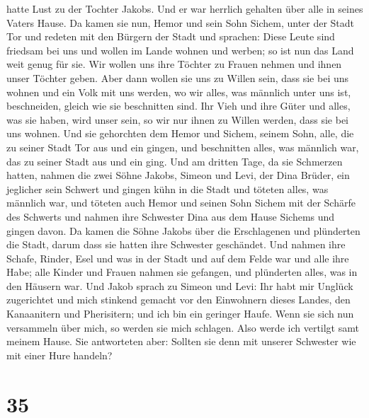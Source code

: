 hatte Lust zu der Tochter Jakobs. Und er war herrlich gehalten über alle
in seines Vaters Hause.  Da kamen sie nun, Hemor und sein
Sohn Sichem, unter der Stadt Tor und redeten mit den Bürgern der Stadt
und sprachen:  Diese Leute sind friedsam bei uns und
wollen im Lande wohnen und werben; so ist nun das Land weit genug für
sie. Wir wollen uns ihre Töchter zu Frauen nehmen und ihnen unser
Töchter geben.  Aber dann wollen sie uns zu Willen sein,
dass sie bei uns wohnen und ein Volk mit uns werden, wo wir alles, was
männlich unter uns ist, beschneiden, gleich wie sie beschnitten sind.
 Ihr Vieh und ihre Güter und alles, was sie haben, wird
unser sein, so wir nur ihnen zu Willen werden, dass sie bei uns wohnen.
 Und sie gehorchten dem Hemor und Sichem, seinem Sohn,
alle, die zu seiner Stadt Tor aus und ein gingen, und beschnitten alles,
was männlich war, das zu seiner Stadt aus und ein ging. 
Und am dritten Tage, da sie Schmerzen hatten, nahmen die zwei Söhne
Jakobs, Simeon und Levi, der Dina Brüder, ein jeglicher sein Schwert und
gingen kühn in die Stadt und töteten alles, was männlich war,
 und töteten auch Hemor und seinen Sohn Sichem mit der
Schärfe des Schwerts und nahmen ihre Schwester Dina aus dem Hause
Sichems und gingen davon.  Da kamen die Söhne Jakobs über
die Erschlagenen und plünderten die Stadt, darum dass sie hatten ihre
Schwester geschändet.  Und nahmen ihre Schafe, Rinder,
Esel und was in der Stadt und auf dem Felde war  und alle
ihre Habe; alle Kinder und Frauen nahmen sie gefangen, und plünderten
alles, was in den Häusern war.  Und Jakob sprach zu
Simeon und Levi: Ihr habt mir Unglück zugerichtet und mich stinkend
gemacht vor den Einwohnern dieses Landes, den Kanaanitern und
Pherisitern; und ich bin ein geringer Haufe. Wenn sie sich nun
versammeln über mich, so werden sie mich schlagen. Also werde ich
vertilgt samt meinem Hause.  Sie antworteten aber:
Sollten sie denn mit unserer Schwester wie mit einer Hure handeln?

\hypertarget{section-34}{%
\section{35}\label{section-34}}

